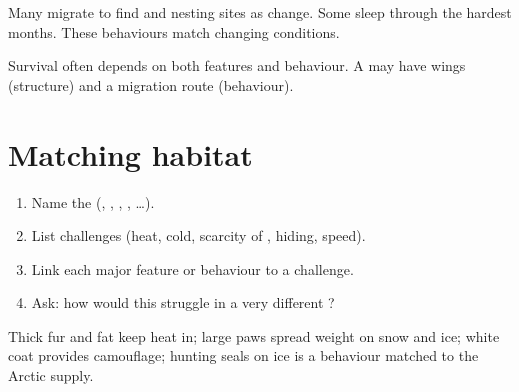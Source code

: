 \begin{example}\label{ex:g4:adaptations:migrate}
Many  migrate to find  and nesting sites as  change.
Some  sleep through the hardest  months. These behaviours
match changing conditions.
\end{example}

\begin{proposition}\label{prop:g4:adaptations:both}
Survival often depends on both  features and behaviour. A  may
have wings (structure) and a migration route (behaviour).
\end{proposition}
\admitted

\section{Matching habitat}


\begin{method}\label{met:g4:adaptations:read}
\begin{enumerate}
  \item Name the  (, , , , \ldots).
  \item List challenges (heat, cold, scarcity of , hiding, speed).
  \item Link each major  feature or behaviour to a challenge.
  \item Ask: how would this  struggle in a very different ?
\end{enumerate}
\end{method}

\begin{example}\label{ex:g4:adaptations:polar}
Thick fur and fat keep heat in; large paws spread weight on snow and
ice; white coat provides camouflage; hunting seals on ice is a
behaviour matched to the Arctic  supply.
\end{example}

